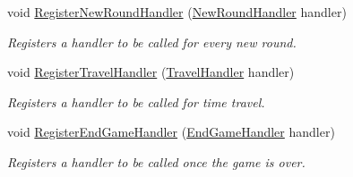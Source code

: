 \begin{DoxyCompactItemize}
void \hyperlink{class_antitelephone_game_ae9c8eb5708660ae72b3fc1042bff4737}{Register\+New\+Round\+Handler} (\hyperlink{class_antitelephone_game_a8133e046c3f00cf8b1b056c6e67666c9}{New\+Round\+Handler} handler)
\begin{DoxyCompactList}\small\item\em Registers a handler to be called for every new round. \end{DoxyCompactList}\item 
void \hyperlink{class_antitelephone_game_acd72999c2c8111ed929f93e7f40b88d1}{Register\+Travel\+Handler} (\hyperlink{class_antitelephone_game_af20c5801994054663bdb537b40c6683d}{Travel\+Handler} handler)
\begin{DoxyCompactList}\small\item\em Registers a handler to be called for time travel. \end{DoxyCompactList}\item 
void \hyperlink{class_antitelephone_game_a2bf00100f24cb1ba9291d358314a8ee8}{Register\+End\+Game\+Handler} (\hyperlink{class_antitelephone_game_a9b790d05b5201d728aa47dd6001f5786}{End\+Game\+Handler} handler)
\begin{DoxyCompactList}\small\item\em Registers a handler to be called once the game is over. \end{DoxyCompactList}\end{DoxyCompactItemize}
